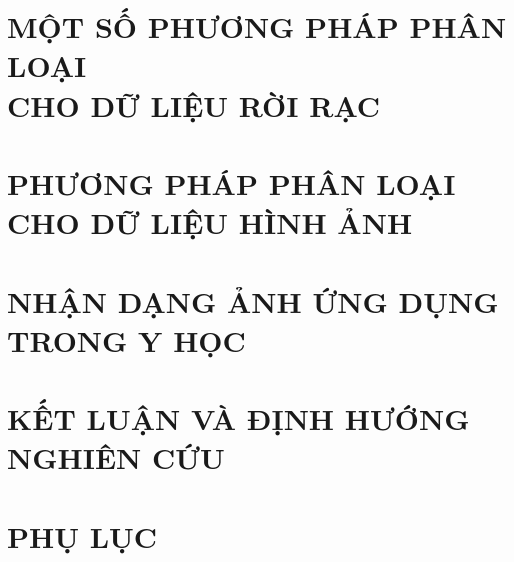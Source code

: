 \documentclass[a4paper,oneside]{report}			%
\theoremstyle{plain} %
\theoremstyle{plain} %
\theoremstyle{nonumberplain} %
\begin{document}
\chapter[MỘT SỐ PHƯƠNG PHÁP PHÂN LOẠI CHO DỮ LIỆU RỜI RẠC]{MỘT SỐ PHƯƠNG PHÁP PHÂN LOẠI\\ CHO DỮ LIỆU RỜI RẠC}

\chapter[PHƯƠNG PHÁP PHÂN LOẠI CHO DỮ LIỆU HÌNH ẢNH]{PHƯƠNG PHÁP PHÂN LOẠI \\CHO DỮ LIỆU HÌNH ẢNH}

\chapter{NHẬN DẠNG ẢNH ỨNG DỤNG TRONG Y HỌC}

\chapter{KẾT LUẬN VÀ ĐỊNH HƯỚNG NGHIÊN CỨU}


\chapter{PHỤ LỤC}\label{phuluc}

\end{document}
